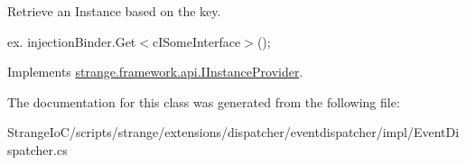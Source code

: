 Retrieve an Instance based on the key. 

ex. {\ttfamily injection\-Binder.\-Get$<$c\-I\-Some\-Interface$>$();} 

Implements \hyperlink{interfacestrange_1_1framework_1_1api_1_1_i_instance_provider_a0bec917157343a46d675ad3a8b6ad65c}{strange.\-framework.\-api.\-I\-Instance\-Provider}.



The documentation for this class was generated from the following file\-:\begin{DoxyCompactItemize}
\item 
Strange\-Io\-C/scripts/strange/extensions/dispatcher/eventdispatcher/impl/Event\-Dispatcher.\-cs\end{DoxyCompactItemize}
